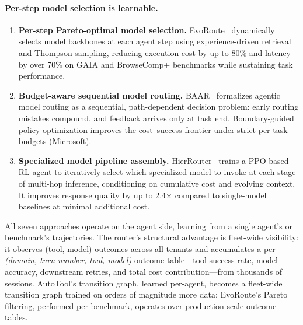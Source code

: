 \begin{opportunity}
\paragraph{Per-step model selection is learnable.}
\begin{enumerate}[nosep]
  \item \textbf{Per-step Pareto-optimal model selection.}
        EvoRoute~\cite{evoroute2026} dynamically selects model
        backbones at each agent step using experience-driven
        retrieval and Thompson sampling, reducing execution cost by
        up to 80\% and latency by over 70\% on GAIA and BrowseComp+
        benchmarks while sustaining task performance.
  \item \textbf{Budget-aware sequential model routing.}
        BAAR~\cite{baar2026} formalizes agentic model routing as a
        sequential, path-dependent decision problem: early routing
        mistakes compound, and feedback arrives only at task end.
        Boundary-guided policy optimization improves the cost--success
        frontier under strict per-task budgets (Microsoft).
  \item \textbf{Specialized model pipeline assembly.}
        HierRouter~\cite{hierouter2025} trains a PPO-based RL agent
        to iteratively select which specialized model to invoke at each
        stage of multi-hop inference, conditioning on cumulative cost
        and evolving context.  It improves response quality by up to
        2.4$\times$ compared to single-model baselines at minimal
        additional cost.
\end{enumerate}

\noindent
All seven approaches operate on the agent side, learning from a
single agent's or benchmark's trajectories.  The router's structural
advantage is fleet-wide visibility: it observes (tool, model)
outcomes across all tenants and accumulates a
per-\emph{(domain, turn-number, tool, model)} outcome table---tool
success rate, model accuracy, downstream retries, and total cost
contribution---from thousands of sessions.  AutoTool's transition
graph, learned per-agent, becomes a fleet-wide transition graph
trained on orders of magnitude more data; EvoRoute's Pareto
filtering, performed per-benchmark, operates over production-scale
outcome tables.


\end{opportunity}

